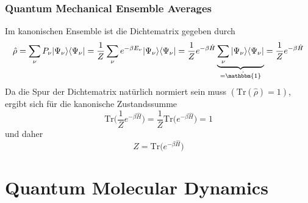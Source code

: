 \documentclass[9pt]{report}
\begin{document}
\subsection{Quantum Mechanical Ensemble Averages}
Im kanonischen Ensemble ist die Dichtematrix gegeben durch
\begin{equation}
\hat{\rho}=\sum_{\nu}P_{\nu}|\Psi_{\nu}\rangle\langle\Psi_{\nu}| =\frac{1}{Z}\sum_{\nu}e^{-\beta E_{\nu}}|\Psi_{\nu}\rangle\langle\Psi_{\nu}| =\frac{1}{Z}e^{-\beta\hat{H}}\underbrace{\sum_{\nu}|\Psi_{\nu}\rangle\langle\Psi_{\nu}|}_{=\hat{\mathbbm{1}}}=\frac{1}{Z}e^{-\beta\hat{H}}
\end{equation}
Da die Spur der Dichtematrix natürlich normiert sein muss $(\mathrm{Tr}(\hat{\rho})=1)$, ergibt sich für die kanonische Zustandssumme
\begin{equation}
\mathrm{Tr}\bigg(\frac{1}{Z}e^{-\beta\hat{H}}\bigg)=\frac{1}{Z}\mathrm{Tr}\big(e^{-\beta\hat{H}}\big)=1
\end{equation}
und daher
\begin{equation}
Z=\mathrm{Tr}\big(e^{-\beta\hat{H}}\big)
\end{equation}























































\chapter{Quantum Molecular Dynamics}
\end{document}
